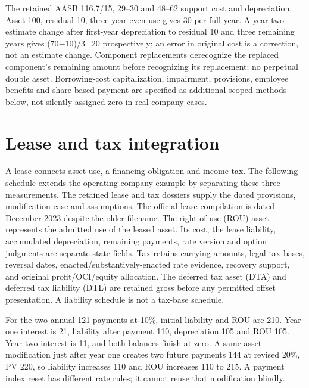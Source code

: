 The retained AASB 116.7/15, 29--30 and 48--62 support cost and depreciation. Asset 100, residual 10, three-year even use gives 30 per full year. A year-two estimate change after first-year depreciation to residual 10 and three remaining years gives (70\ensuremath{-}10)/3=20 prospectively; an error in original cost is a correction, not an estimate change. Component replacements derecognize the replaced component's remaining amount before recognizing its replacement; no perpetual double asset. Borrowing-cost capitalization, impairment, provisions, employee benefits and share-based payment are specified as additional scoped methods below, not silently assigned zero in real-company cases.



\hypertarget{lease-and-tax-integration}{%
\section{Lease and tax integration}\label{method-corporate-methods-lease-and-tax-integration}}

A lease connects asset use, a financing obligation and income tax. The following schedule extends the operating-company example by separating these three measurements. The retained lease and tax dossiers supply the dated provisions, modification case and assumptions. The official lease compilation is dated December 2023 despite the older filename. The right-of-use (ROU) asset represents the admitted use of the leased asset. Its cost, the lease liability, accumulated depreciation, remaining payments, rate version and option judgments are separate state fields. Tax retains carrying amounts, legal tax bases, reversal dates, enacted/substantively-enacted rate evidence, recovery support, and original profit/OCI/equity allocation. The deferred tax asset (DTA) and deferred tax liability (DTL) are retained gross before any permitted offset presentation. A liability schedule is not a tax-base schedule.

For the two annual 121 payments at 10\%, initial liability and ROU are 210. Year-one interest is 21, liability after payment 110, depreciation 105 and ROU 105. Year two interest is 11, and both balances finish at zero. A same-asset modification just after year one creates two future payments 144 at revised 20\%, PV 220, so liability increases 110 and ROU increases 110 to 215. A payment index reset has different rate rules; it cannot reuse that modification blindly.

